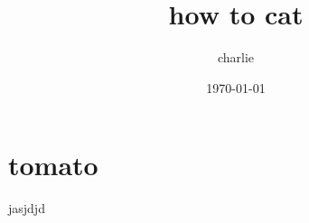 \documentclass[a4paper,25pt]{book}
\begin{document}
	\tableofcontents
	\title{how to cat}
	\author{charlie}
	\date{\today}
	
	\chapter{tomato}
	jasjdjd
\end{document}
